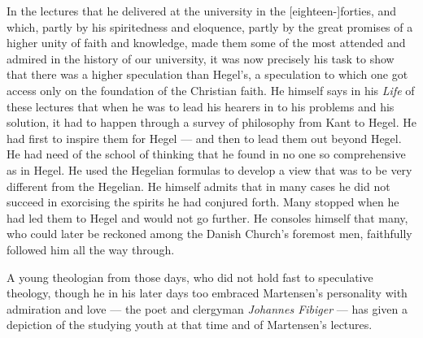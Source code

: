 \documentclass[12pt,a4paper]{book}
\newcommand{\opage}[1]{\marginnote{\footnotesize\textit{[#1]}}}
\begin{document}
In the lectures that he delivered at the university in the [eighteen-]forties, and which, partly by
his spiritedness and eloquence, partly by the great promises of a higher unity of faith and
knowledge, made them some of the most attended and admired in the history of our university, it was
now precisely his task to show that there was a higher speculation than Hegel's, a speculation to
which one got access only on the foundation of the Christian faith. He \opage{142}himself says in his
\emph{Life} of these lectures that when he was to lead his hearers in to his problems and his
solution, it had to happen through a survey of philosophy from Kant to Hegel. He had first to
inspire them for Hegel --- and then to lead them out beyond Hegel. He had need of the school of
thinking that he found in no one so comprehensive as in Hegel. He used the Hegelian formulas to
develop a view that was to be very different from the Hegelian. He himself admits that in many
cases he did not succeed in exorcising the spirits he had conjured forth. Many stopped when he had
led them to Hegel and would not go further. He consoles himself that many, who could later be
reckoned among the Danish Church's foremost men, faithfully followed him all the way through.

A young theologian from those days, who did not hold fast to speculative theology, though he in his
later days too embraced Martensen's personality with admiration and love --- the poet and clergyman
\emph{Johannes Fibiger} --- has given a depiction of the studying youth at that time and of Martensen's
lectures.
\end{document}
